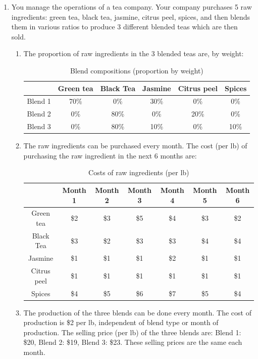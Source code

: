 \documentclass[11pt]{article}
\begin{document}
\begin{enumerate}
    \item You manage the operations of a tea company. Your company purchases 5 raw ingredients: green tea, black tea, jasmine,  citrus peel, spices, and then blends them in various ratios to produce 3 different blended teas which are then sold.   

\begin{enumerate}
\item The proportion of raw ingredients in the 3 blended teas are, by weight:
\begin{table}[htp]
\caption{Blend compositions (proportion by weight)}
\begin{center}
\begin{tabular}{|c|c|c|c|c|c|}
\hline
& Green tea & Black Tea & Jasmine & Citrus peel & Spices \\
\hline 
Blend 1 & 70\% & 0\% & 30\% & 0\%& 0\%\\ 
\hline 
Blend 2 &0\%  & 80\%& 0\%& 20\% &0\% \\ 
\hline
Blend 3 &  0\%& 80\%& 10\% &0\% & 10\% \\ 
\hline
\end{tabular}
\end{center}
\label{BlendCompositions}
\end{table}%

\item The raw ingredients can be purchased every month. The cost (per lb) of purchasing the raw ingredient in the next 6 months are:
\begin{table}[htp]
\caption{Costs of raw ingredients (per lb)}
\begin{center}
\begin{tabular}{|c|c|c|c|c|c|c|}
\hline
 & Month 1 & Month 2 & Month 3 & Month 4 & Month 5 & Month 6 \\
\hline
Green tea & \$2 &\$3  &\$5  &\$4  &\$3 & \$2\\
\hline 
Black Tea  & \$3  & \$2 & \$3 & \$3& \$4 & \$4\\ 
\hline 
Jasmine & \$1 &\$1 &\$1 &\$2 & \$1& \$1\\ 
\hline
Citrus peel & \$1 &\$1 & \$1& \$1& \$1&\$1 \\ 
\hline
Spices & \$4 & \$5 & \$6 & \$7 &\$5 & \$4 \\
\hline 
\end{tabular}
\end{center}
\label{Costs}
\end{table}%

\item The production of the three blends can be done every month. The cost of production is \$2 per  lb, independent of blend type or month of production. The selling price (per lb) of the three blends are: Blend 1: \$20, Blend 2: \$19, Blend 3: \$23. These selling prices are the same each month. 
 

\end{enumerate}
\end{enumerate}
\end{document}
